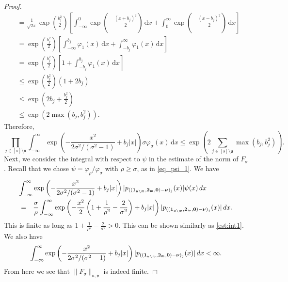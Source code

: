 \documentclass[10pt,a4paper]{amsart}
\newcommand{\bsnu}{\boldsymbol{\nu}}
\newcommand{\bsone}{\boldsymbol{1}}
\newcommand{\bstwo}{\boldsymbol{2}}
\newcommand{\bszero}{\boldsymbol{0}}
\newcommand{\rd}{\, {\rm d}}
\newcommand{\uu}{\mathfrak{u}}
\newcommand{\vv}{\mathfrak{v}}
\newcommand{\ww}{\mathfrak{w}}
\begin{document}
\begin{proof}
\begin{align}
&= \frac{1}{\sqrt{2 \pi}} \exp\left(\frac{b_j^2}{2}\right) \left[\int_{-\infty}^0 \exp\left(-\frac{(x+b_j)^2}{2}\right) \,\mathrm{d} x + \int_0^{\infty} \exp\left(-\frac{(x-b_j)^2}{2}\right)   \,\mathrm{d} x\right]\nonumber\\
&= \exp\left(\frac{b_j^2}{2}\right) \left[\int_{-\infty}^{b_j} \varphi_1(x) \,\mathrm{d} x + \int_{-b_j}^{\infty} \varphi_1(x)   \,\mathrm{d} x\right]\nonumber\\
&= \exp\left(\frac{b_j^2}{2}\right) \left[1+\int_{-b_j}^{b_j} \varphi_1(x)   \,\mathrm{d} x\right]\nonumber\\
&\le \exp\left(\frac{b_j^2}{2}\right) (1+2 b_j)\nonumber\\
& \le \exp\left(2 b_j+\frac{b_j^2}{2}\right)\nonumber\\
& \le \exp\left(2 \max(b_j,b_j^2)\right).
\end{align}
Therefore, 
$$\prod_{j \in [s]\setminus \uu} \int_{-\infty}^{\infty} \exp\left(-\frac{x^2}{2 \sigma^2/(\sigma^2-1)} +b_j|x|\right) \sigma \varphi_{\sigma}(x) \,\mathrm{d} x \le \exp\left(2 \sum_{j \in [s]\setminus \uu} \max(b_j,b_j^2)\right).$$
Next, we consider the integral with respect to $\psi$ in the estimate of the norm of $F_{\sigma}$. Recall that we chose $\psi = \varphi_\rho/ \varphi_\sigma$ with $\rho \ge \sigma$, as in \eqref{eq_psi_1}. We have 
\begin{eqnarray*}
\lefteqn{\int_{-\infty}^{\infty} \exp\left(-\frac{x^2}{2 \sigma^2/(\sigma^2-1)} +b_j|x|\right) | p_{((\bsone_{\uu \setminus \ww},\bstwo_{\ww},\bszero) -\bsnu)_j}(x)|  \psi(x) \rd x}  \\ 
& = & \frac{\sigma}{\rho} \int_{-\infty}^\infty \exp\left(-\frac{x^2}{2} \left(1+ \frac{1}{\rho^2} - \frac{2}{\sigma^2} \right)  + b_j |x| \right) |p_{((\bsone_{\uu \setminus \ww},\bstwo_{\ww},\bszero) -\bsnu)_j}(x)|  \rd x.
\end{eqnarray*}
This is finite as long as $1 + \frac{1}{\rho^2} - \frac{2}{\sigma^2} > 0$. This can be shown similarly as \eqref{est:int1}. We also have 
\begin{equation*}%
\int_{-\infty}^{\infty}  \exp\left(-\frac{x^2}{2 \sigma^2/(\sigma^2-1)} +b_j|x|\right) |p_{((\bsone_{\uu \setminus \ww},\bstwo_{\ww},\bszero) -\bsnu)_j}(x)|  \rd x < \infty.
\end{equation*}
From here we see that $\|F_{\sigma}\|_{\uu,\vv}$ is indeed finite. \end{proof}
\end{document}
